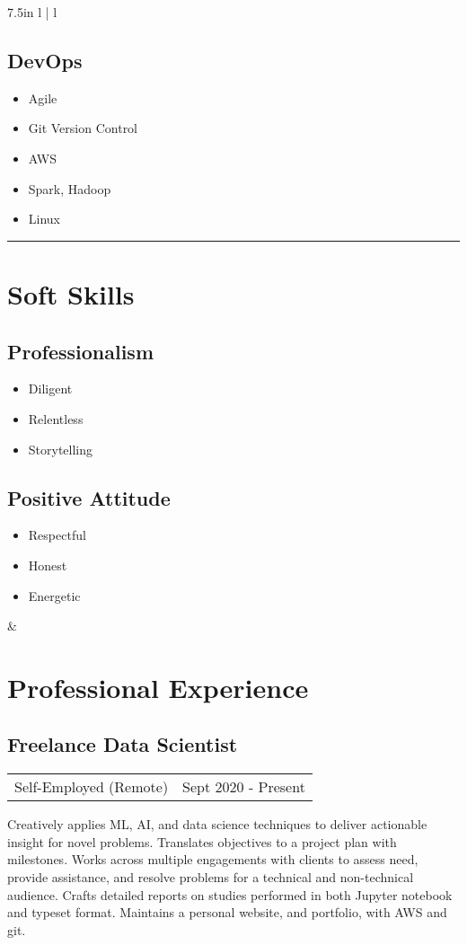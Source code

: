 \documentclass{article}
\begin{document}
\begin{tabular*}{7.5in}{ l | l}
\begin{minipage}[t]{2.0in}
	\subsection*{DevOps}
	\begin{itemize}[noitemsep]
		\item Agile
		\item Git Version Control
		\item AWS
		\item Spark, Hadoop
		\item Linux
	\end{itemize}
	\hrule
	\section*{Soft Skills}
	\subsection*{Professionalism}
	\begin{itemize}[noitemsep]
		\item Diligent
		\item Relentless
		\item Storytelling
	\end{itemize}
	\subsection*{Positive Attitude}
	\begin{itemize}[noitemsep]
		\item Respectful
		\item Honest
		\item Energetic
	\end{itemize}
	\smallskip
	\end{minipage} &
	
	\begin{minipage}[t]{5.25in}
	\section*{Professional Experience}
	\subsection*{Freelance Data Scientist}
	\begin{tabular*}{\columnwidth}{@{\extracolsep{\fill}}lr}
	Self-Employed (Remote) & Sept 2020 - Present
	\end{tabular*}
	Creatively applies ML, AI, and data science techniques to deliver actionable insight for novel problems.
	Translates objectives to a project plan with milestones.
	Works across multiple engagements with clients to assess need, provide assistance, and resolve problems for a technical and non-technical audience.
	Crafts detailed reports on studies performed in both Jupyter notebook and typeset format.
	Maintains a personal website, and portfolio, with AWS and git.
	\medskip

\end{minipage}
\end{tabular*}
\end{document}

